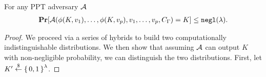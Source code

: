 \begin{lemma}
	\label{lemma:hardLearnK}
	For any PPT adversary $\mathcal{A}$
	\begin{align}
		\label{eq:Kindist}
		\operatorname*{\mathbf{Pr}}[\mathcal{A}(\phi(K, v_1), \dots, \phi(K, v_p), v_1, \dots, v_p, C_\Gamma) = K]
			\leq \texttt{negl}(\lambda). \notag
	\end{align}
	\begin{proof}
		We proceed via a series of hybrids to build two computationally indistinguishable distributions.
		We then show that assuming $\mathcal{A}$ can output $K$ with non-negligible probability, we can distinguish the two distributions.
		First, let $K' \overset{\$}{\gets} \set{0, 1}^\lambda$.
		

\end{proof}
\end{lemma}
